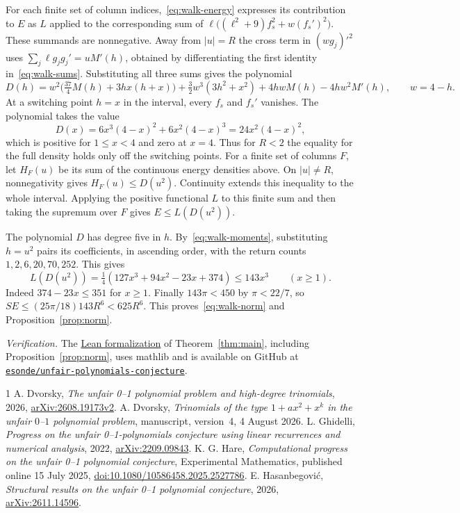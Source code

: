 \documentclass[11pt,reqno]{amsart}
\numberwithin{equation}{section}
\begin{document}
For each finite set of column indices,~\eqref{eq:walk-energy} expresses its contribution to $E$ as $L$ applied to the corresponding sum of $\ell\big((\ell^2+9)f_s^2+w(f_s')^2\big)$. These summands are nonnegative. Away from $|u|=R$ the cross term in $(w g_j)'^2$ uses $\sum_j\ell g_jg_j'=uM'(h)$, obtained by differentiating the first identity in~\eqref{eq:walk-sums}. Substituting all three sums gives the polynomial
\[
 D(h)= w^2\big(\tfrac{37}{4}M(h)+3hx(h+x)\big)
       +\tfrac32 w^3(3h^2+x^2)+4hw M(h)-4hw^2M'(h),
 \qquad w=4-h .
\]
At a switching point $h=x$ in the interval, every $f_s$ and $f_s'$ vanishes. The polynomial takes the value
\[
 D(x)=6x^3(4-x)^2+6x^2(4-x)^3=24x^2(4-x)^2,
\]
which is positive for $1\le x<4$ and zero at $x=4$. Thus for $R<2$ the equality for the full density holds only off the switching points. For a finite set of columns $F$, let $H_F(u)$ be its sum of the continuous energy densities above. On $|u|\ne R$, nonnegativity gives $H_F(u)\le D(u^2)$. Continuity extends this inequality to the whole interval. Applying the positive functional $L$ to this finite sum and then taking the supremum over $F$ gives $E\le L(D(u^2))$.

The polynomial $D$ has degree five in $h$. By~\eqref{eq:walk-moments}, substituting $h=u^2$ pairs its coefficients, in ascending order, with the return counts $1,2,6,20,70,252$. This gives
\[
 L(D(u^2))=\tfrac14(127x^3+94x^2-23x+374)\le143x^3
 \qquad(x\ge1).
\]
Indeed $374-23x\le351$ for $x\ge1$. Finally $143\pi<450$ by $\pi<22/7$, so $SE\le(25\pi/18)143R^6<625R^6$. This proves~\eqref{eq:walk-norm} and Proposition~\ref{prop:norm}.

\medskip
\noindent\textit{Verification.} The \href{https://github.com/esonde/unfair-polynomials-conjecture/blob/f3412623374567cd22bdacb994c36b1719621238/lean/README.md}{Lean formalization} of Theorem~\ref{thm:main}, including Proposition~\ref{prop:norm}, uses mathlib and is available on GitHub at \href{https://github.com/esonde/unfair-polynomials-conjecture}{\texttt{esonde/unfair-polynomials-conjecture}}.

\begin{thebibliography}{1}
A. Dvorsky, \emph{The unfair 0--1 polynomial problem and high-degree trinomials}, 2026, \href{https://arxiv.org/abs/2608.19173v2}{arXiv:2608.19173v2}.
A. Dvorsky, \emph{Trinomials of the type $1+ax^2+x^k$ in the unfair $0$--$1$ polynomial problem}, manuscript, version~4, 4 August 2026.
L. Ghidelli, \emph{Progress on the unfair 0--1-polynomials conjecture using linear recurrences and numerical analysis}, 2022, \href{https://arxiv.org/abs/2209.09843}{arXiv:2209.09843}.
K. G. Hare, \emph{Computational progress on the unfair 0--1 polynomial conjecture}, Experimental Mathematics, published online 15 July 2025, \href{https://doi.org/10.1080/10586458.2025.2527786}{doi:10.1080/10586458.2025.2527786}.
E. Hasanbegovi\'c, \emph{Structural results on the unfair 0--1 polynomial conjecture}, 2026, \href{https://arxiv.org/abs/2611.14596}{arXiv:2611.14596}.
\end{thebibliography}
\end{document}
